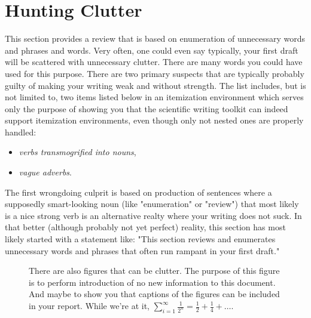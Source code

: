 \documentclass[twocolumn,11pt]{article}
\begin{document}
\section{Hunting Clutter}

This section provides a review that is based on enumeration of unnecessary words and phrases and words. Very often, one could even say typically, your first draft will be scattered with unnecessary clutter. There are many words you could have used for this purpose. There are two primary suspects that are typically probably guilty of making your writing weak and without strength. The list includes, but is not limited to, two items listed below in an itemization environment which serves only the purpose of showing you that the scientific writing toolkit can indeed support itemization environments, even though only not nested ones are properly handled: 

\begin{itemize}
	\item \emph{verbs transmogrified into nouns},
	\item \emph{vague adverbs}.
\end{itemize}

The first wrongdoing culprit is based on production of sentences where a supposedly smart-looking noun (like "enumeration" or "review") that most likely is a nice strong verb is an alternative realty where your writing does not suck. In that better (although probably not yet perfect) reality, this section has most likely started with a statement like: "This section reviews and enumerates unnecessary words and phrases that often run rampant in your first draft."

\begin{figure}
\centering
{}
\caption{There are also figures that can be clutter. The purpose of this figure is to perform introduction of no new information to this document. And maybe to show you that captions of the figures can be included in your report. While we're at it, $\sum_{i=1}^{\infty}\frac{1}{2^n}=\frac{1}{2} + \frac{1}{4} + \ldots$.}
\end{figure}
\end{document}
